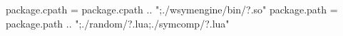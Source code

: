 \usepackage{amsmath}
\usepackage{amssymb}

\usepackage{tikz}
\usepackage{pgfplots}
\pgfplotsset{compat=newest}

\usepackage{luacode}
\usepackage{luapackageloader}

\begin{luacode*}
    package.cpath = package.cpath .. ";./wsymengine/bin/?.so"
    package.path = package.path .. ";./random/?.lua;./symcomp/?.lua"
\end{luacode*}

\newcommand{\scprint}[1]{\luaexec{tex.print{symcomp.getstringlatex(#1)}}}
\newcommand{\print}[1]{\luaexec{tex.print{#1}}}
\newcommand{\printintegral}[4]{\luaexec{tex.print{symcomp.printintegral(#1, #2, #3, #4)}}}
